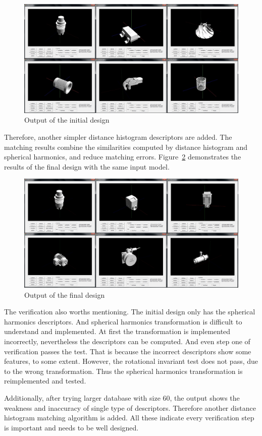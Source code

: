 \begin{figure}[h]
\centering
\includegraphics[width=0.7\linewidth]{output_initialdesign}
\caption{Output of the initial design} \label{output_initialdesign}
\end{figure}

Therefore, another simpler distance histogram  descriptors are added. The matching results combine the similarities computed by distance histogram and spherical harmonics, and reduce matching errors. Figure~\ref{output_finaldesign} demonstrates the results of the final design with the same input model. 
\begin{figure}[h]
\centering
\includegraphics[width=0.7\linewidth]{output_finaldesign}
\caption{Output of the final design} \label{output_finaldesign}
\end{figure}

The verification also worths mentioning. The initial design only has the spherical harmonics descriptors. And spherical harmonics transformation is difficult to understand and implemented. At first the transformation is implemented incorrectly, nevertheless the descriptors can be computed. And even step one of verification passes the test. That is because the incorrect descriptors show some features, to some extent. However, the rotational invariant test does not pass, due to the wrong transformation. Thus the spherical harmonics transformation is reimplemented and tested. 

Additionally, after trying larger database with size 60, the output shows the weakness and inaccuracy of single type of descriptors. Therefore another distance histogram matching algorithm is added. All these indicate every verification step is important and needs to be well designed.